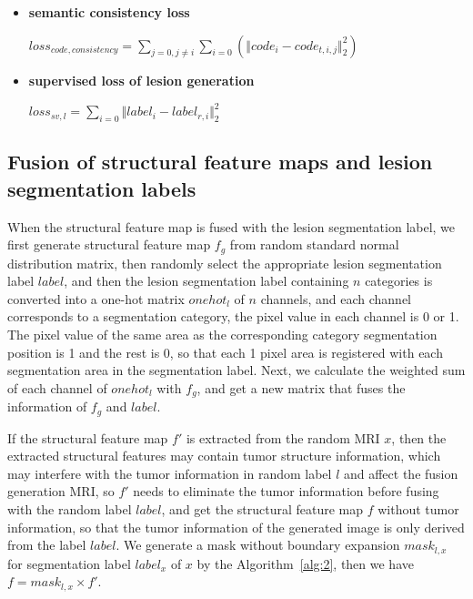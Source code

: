 \documentclass[letterpaper]{article} %
\begin{document}
\begin{itemize}
	\item \textbf{semantic consistency loss}
	\begin{center}
		$loss_{code,consistency}=\sum\limits_{j=0,j\neq i}\sum\limits_{i=0}(\Vert{code_i-code_{t,i,j}}\Vert_{2}^{2})$
	\end{center}
	
	\item \textbf{supervised loss of lesion generation}
	\begin{center}
		$loss_{sv,l}=\sum\limits_{i=0}\Vert{label_i-label_{r,i}}\Vert_{2}^{2}$
	\end{center}
	
\end{itemize}

\subsection{Fusion of structural feature maps and lesion segmentation labels}

When the structural feature map is fused with the lesion segmentation label, we first generate structural feature map $f_g$ from random standard normal distribution matrix, then randomly select the appropriate lesion segmentation label $label$, and then the lesion segmentation label containing $n$ categories is converted into a one-hot matrix $onehot_l$ of $n$ channels, and each channel corresponds to a segmentation category, the pixel value in each channel is 0 or 1. The pixel value of the same area as the corresponding category segmentation position is 1 and the rest is 0, so that each 1 pixel area is registered with each segmentation area in the segmentation label. Next, we calculate the weighted sum of each channel of $onehot_l$ with $f_g$, and get a new matrix that fuses the information of $f_g$ and $label$.

If the structural feature map $f'$ is extracted from the random MRI $x$, then the extracted structural features may contain tumor structure information, which may interfere with the tumor information in random label $l$ and affect the fusion generation MRI, so $f'$ needs to eliminate the tumor information before fusing with the random label $label$, and get the structural feature map $f$ without tumor information, so that the tumor information of the generated image is only derived from the label $label$. We generate a  mask without boundary expansion $mask_{l,x}$ for segmentation label $label_x$ of $x$ by the Algorithm~\ref{alg:2}, then we have $f=mask_{l,x}\times f'$.
\end{document}
